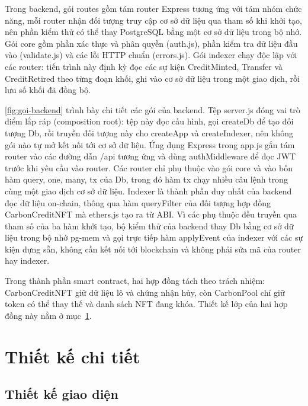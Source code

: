 \HinhGoiFrontend

Trong backend, gói routes gồm tám router Express tương ứng với tám nhóm chức năng, mỗi router nhận đối tượng truy cập cơ sở dữ liệu qua tham số khi khởi tạo, nên phần kiểm thử có thể thay PostgreSQL bằng một cơ sở dữ liệu trong bộ nhớ. Gói core gồm phần xác thực và phân quyền (auth.js), phần kiểm tra dữ liệu đầu vào (validate.js) và các lỗi HTTP chuẩn (errors.js). Gói indexer chạy độc lập với các router: tiến trình này định kỳ đọc các sự kiện CreditMinted, Transfer và CreditRetired theo từng đoạn khối, ghi vào cơ sở dữ liệu trong một giao dịch, rồi lưu số khối đã đồng bộ.

\autoref{fig:goi-backend} trình bày chi tiết các gói của backend. Tệp server.js đóng vai trò điểm lắp ráp (composition root): tệp này đọc cấu hình, gọi createDb để tạo đối tượng Db, rồi truyền đối tượng này cho createApp và createIndexer, nên không gói nào tự mở kết nối tới cơ sở dữ liệu. Ứng dụng Express trong app.js gắn tám router vào các đường dẫn /api tương ứng và dùng authMiddleware để đọc JWT trước khi yêu cầu vào router. Các router chỉ phụ thuộc vào gói core và vào bốn hàm query, one, many, tx của Db, trong đó hàm tx chạy nhiều câu lệnh trong cùng một giao dịch cơ sở dữ liệu. Indexer là thành phần duy nhất của backend đọc dữ liệu on-chain, thông qua hàm queryFilter của đối tượng hợp đồng CarbonCreditNFT mà ethers.js tạo ra từ ABI. Vì các phụ thuộc đều truyền qua tham số của ba hàm khởi tạo, bộ kiểm thử của backend thay Db bằng cơ sở dữ liệu trong bộ nhớ pg-mem và gọi trực tiếp hàm applyEvent của indexer với các sự kiện dựng sẵn, không cần kết nối tới blockchain và không phải sửa mã của router hay indexer.

\HinhGoiBackend

Trong thành phần smart contract, hai hợp đồng tách theo trách nhiệm: CarbonCreditNFT giữ dữ liệu lô và chứng nhận hủy, còn CarbonPool chỉ giữ token có thể thay thế và danh sách NFT đang khóa. Thiết kế lớp của hai hợp đồng này nằm ở mục~\ref{sec:tk-chitiet}.

\section{Thiết kế chi tiết}
\label{sec:tk-chitiet}

\subsection*{Thiết kế giao diện}
\label{subsec:tk-giaodien}

